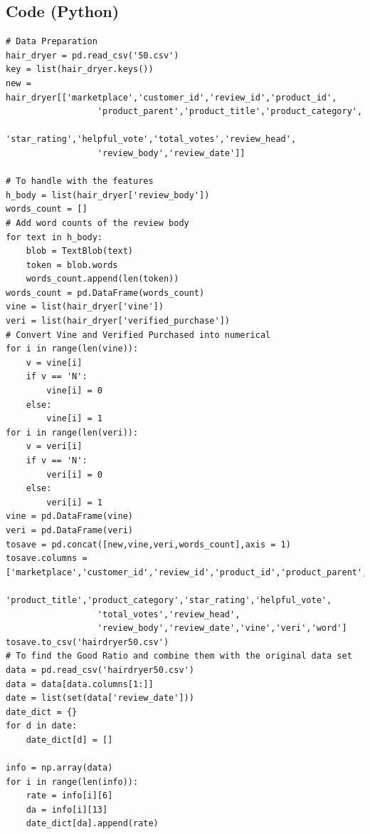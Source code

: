 \documentclass[12pt]{article}
\begin{document}
\begin{appendices}
\begin{lstlisting}
\end{lstlisting}

\subsection{Code (Python)}


\begin{lstlisting}
# Data Preparation
hair_dryer = pd.read_csv('50.csv')
key = list(hair_dryer.keys())
new = hair_dryer[['marketplace','customer_id','review_id','product_id',
                  'product_parent','product_title','product_category',
                  'star_rating','helpful_vote','total_votes','review_head',
                  'review_body','review_date']]

# To handle with the features
h_body = list(hair_dryer['review_body'])
words_count = []
# Add word counts of the review body
for text in h_body:
    blob = TextBlob(text)
    token = blob.words
    words_count.append(len(token))
words_count = pd.DataFrame(words_count)
vine = list(hair_dryer['vine'])
veri = list(hair_dryer['verified_purchase'])
# Convert Vine and Verified Purchased into numerical
for i in range(len(vine)):
    v = vine[i]
    if v == 'N':
        vine[i] = 0
    else:
        vine[i] = 1
for i in range(len(veri)):
    v = veri[i]
    if v == 'N':
        veri[i] = 0
    else:
        veri[i] = 1
vine = pd.DataFrame(vine)
veri = pd.DataFrame(veri) 
tosave = pd.concat([new,vine,veri,words_count],axis = 1)
tosave.columns = ['marketplace','customer_id','review_id','product_id','product_parent',
                  'product_title','product_category','star_rating','helpful_vote',
                  'total_votes','review_head',
                  'review_body','review_date','vine','veri','word']
tosave.to_csv('hairdryer50.csv')
# To find the Good Ratio and combine them with the original data set
data = pd.read_csv('hairdryer50.csv')
data = data[data.columns[1:]]
date = list(set(data['review_date']))
date_dict = {}
for d in date:
    date_dict[d] = []

info = np.array(data)
for i in range(len(info)):
    rate = info[i][6]
    da = info[i][13]
    date_dict[da].append(rate)


\end{lstlisting}
\end{appendices}
\end{document}
